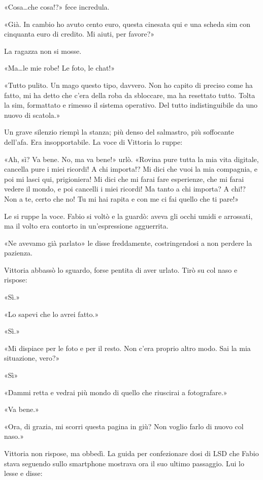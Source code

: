 «Cosa\ldots che cosa!?» fece incredula.

«Già. In cambio ho avuto cento euro, questa cinesata qui e una scheda sim con cinquanta euro di credito. Mi aiuti, per favore?»

La ragazza non si mosse.

«Ma\ldots le mie robe! Le foto, le chat!»

«Tutto pulito. Un mago questo tipo, davvero. Non ho capito di preciso come ha fatto, mi ha detto che c'era della roba da sbloccare, ma ha resettato tutto. Tolta la sim, formattato e rimesso il sistema operativo. Del tutto indistinguibile da uno nuovo di scatola.»

Un grave silenzio riempì la stanza; più denso del salmastro, più soffocante dell'afa. Era insopportabile. La voce di Vittoria lo ruppe:

«Ah, sì? Va bene. No, ma va bene!» urlò. «Rovina pure tutta la mia vita digitale, cancella pure i miei ricordi! A chi importa!? Mi dici che vuoi la mia compagnia, e poi mi lasci qui, prigioniera! Mi dici che mi farai fare esperienze, che mi farai vedere il mondo, e poi cancelli i miei ricordi! Ma tanto a chi importa? A chi!? Non a te, certo che no! Tu mi hai rapita e con me ci fai quello che ti pare!»

Le si ruppe la voce. Fabio si voltò e la guardò: aveva gli occhi umidi e arrossati, ma il volto era contorto in un'espressione agguerrita.

«Ne avevamo già parlato» le disse freddamente, costringendosi a non perdere la pazienza.

Vittoria abbassò lo sguardo, forse pentita di aver urlato. Tirò su col naso e rispose:

«Sì.»

«Lo sapevi che lo avrei fatto.»

«Sì.»

«Mi dispiace per le foto e per il resto. Non c'era proprio altro modo. Sai la mia situazione, vero?»

«Sì»

«Dammi retta e vedrai più mondo di quello che riuscirai a fotografare.»

«Va bene.»

«Ora, di grazia, mi scorri questa pagina in giù? Non voglio farlo di nuovo col naso.»

Vittoria non rispose, ma obbedì. La guida per confezionare dosi di LSD che Fabio stava seguendo sullo smartphone mostrava ora il suo ultimo passaggio. Lui lo lesse e disse:

